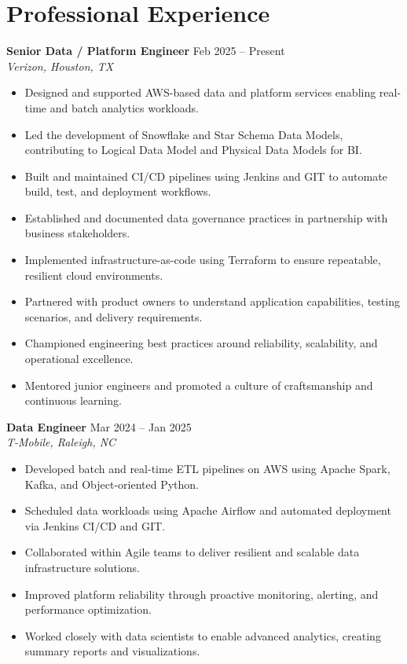 \documentclass[10pt]{article}
\begin{document}
\section*{Professional Experience}

\textbf{Senior Data / Platform Engineer} \hfill Feb 2025 -- Present \\
\textit{Verizon, Houston, TX}
\begin{itemize}[leftmargin=*, itemsep=3pt]
    \item Designed and supported AWS-based data and platform services enabling real-time and batch analytics workloads.
    \item Led the development of Snowflake and Star Schema Data Models, contributing to Logical Data Model and Physical Data Models for BI.
    \item Built and maintained CI/CD pipelines using Jenkins and GIT to automate build, test, and deployment workflows.
    \item Established and documented data governance practices in partnership with business stakeholders.
    \item Implemented infrastructure-as-code using Terraform to ensure repeatable, resilient cloud environments.
    \item Partnered with product owners to understand application capabilities, testing scenarios, and delivery requirements.
    \item Championed engineering best practices around reliability, scalability, and operational excellence.
    \item Mentored junior engineers and promoted a culture of craftsmanship and continuous learning.
\end{itemize}

\textbf{Data Engineer} \hfill Mar 2024 -- Jan 2025 \\
\textit{T-Mobile, Raleigh, NC}
\begin{itemize}[leftmargin=*, itemsep=3pt]
    \item Developed batch and real-time ETL pipelines on AWS using Apache Spark, Kafka, and Object-oriented Python.
    \item Scheduled data workloads using Apache Airflow and automated deployment via Jenkins CI/CD and GIT.
    \item Collaborated within Agile teams to deliver resilient and scalable data infrastructure solutions.
    \item Improved platform reliability through proactive monitoring, alerting, and performance optimization.
    \item Worked closely with data scientists to enable advanced analytics, creating summary reports and visualizations.
\end{itemize}
\end{document}

